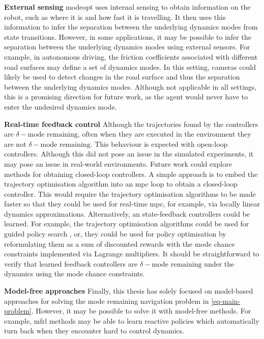 \documentclass{mimosis-class/mimosis}
\numberwithin{equation}{chapter}
\begin{document}
{\textbf{External sensing}
\acrshort{modeopt} uses internal sensing to obtain information on the robot, such as where it is and how fast it is travelling.
It then uses this information to infer the separation between the underlying dynamics modes from state transitions.
However, in some applications, it may be possible to infer the separation between the underlying dynamics modes
using external sensors.
For example, in autonomous driving, the friction coefficients associated with different road surfaces may
define a set of dynamics modes.
In this setting, cameras could likely be used to detect changes in the road surface and thus
the separation between the underlying dynamics modes.
Although not applicable in all settings,
this is a promising direction for future work, as the agent would never have to enter the undesired dynamics mode.

\textbf{Real-time feedback control}
Although the trajectories found by the controllers are \(\delta-\text{mode remaining}\), often when
they are executed in the environment they are not \(\delta-\text{mode remaining}\).
This behaviour is expected with open-loop controllers.
Although this did not pose an issue in the simulated experiments, it may pose an issue in real-world environments.
Future work could explore methods for obtaining closed-loop controllers.
A simple approach is to embed the trajectory optimisation algorithm into an \acrshort{mpc} loop to obtain a
closed-loop controller.
This would require the trajectory optimisation algorithms to be made faster
so that they could be used for real-time \acrshort{mpc}, for example, via locally linear dynamics approximations.
Alternatively, an state-feedback controllers could be learned.
For example, the trajectory optimisation algorithms could be used for guided policy search \citep{levineGuided2013},
or, they could be used for policy optimisation by reformulating them as a sum of discounted rewards
with the mode chance constraints implemented via Lagrange multipliers.
It should be straightforward to verify that learned feedback controllers are
\(\delta-\text{mode remaining}\) under the dynamics using the mode chance constraints.

\textbf{Model-free approaches}
Finally, this thesis has solely focused on model-based approaches for solving the
mode remaining navigation problem in \cref{eq-main-problem}.
However, it may be possible to solve it with model-free methods.
For example, \acrfull{mfrl} methods may be able to learn reactive policies
which automatically turn back when they encounter hard to control dynamics.

\begingroup
\sloppy
{}
\setlength\bibitemsep{3pt}
\printbibliography
\endgroup
\backmatter
\end{document}
